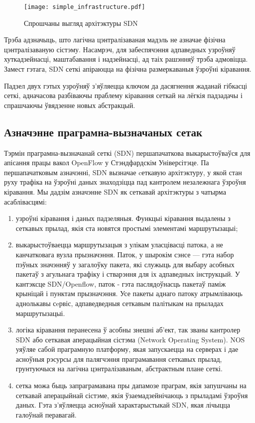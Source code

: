 \clearpage

\begin{figure}[ht!]
    \centering
    \texttt{[image: simple\_infrastructure.pdf]}
    \vspace{-\baselineskip}
    \caption{Спрошчаны выгляд архітэктуры SDN}
    \label{img: Simple Infrastructure}
\end{figure}

Трэба адзначыць, што лагічна цэнтралізаваная мадэль не азначае фізічна цэнтралізаваную сістэму.
Насамрэч, для забеспячэння адпаведных узроўняў хуткадзейнасці, маштабавання і надзейнасці,
ад таіх рашэнняў трэба адмовіцца. Замест гэтага, SDN сеткі апіраюцца на фізічна размеркаваныя
ўзроўні кіравання.

Падзел двух гэтых узроўняў з'яўляецца ключом да дасягнення жаданай гібкасці сеткі,
адначасова разбіваючы праблему кіравання сеткай на лёгкія падзадачы і спрашчаючы ўвядзенне новых абстракцый.

\subsection{Азначэнне праграмна-вызначаных сетак}

Тэрмін праграмна-вызначанай сеткі (SDN) першапачаткова выкарыстоўваўся для апісання
працы вакол OpenFlow у Стэндфардскім Універсітэце.
Па першапачатковым азначэнні, SDN вызначае
cеткавую архітэктуру, у якой стан руху трафіка на ўзроўні даных
знаходзіцца пад кантролем  незалежнага ўзроўня кіравання.
Мы дадзім азначэнне SDN як сеткавай архітэктуры з
чатырма асаблівасцямі:
\begin{enumerate}
    \item узроўні кіравання і даных падзеляныя. Функцыі кіравання выдалены з сеткавых прылад, якія ста
новятся простымі элементамі маршрутызацыі;
    \item выкарыстоўваецца маршрутызацыя з улікам уласцівасці патока, а не канчатковага вузла прызначэння. Паток, у шырокім сэнсе --- гэта набор пэўных значэнняў у загалоўку пакета,
які служыць для выбару асобных пакетаў з агульнага трафіку і стварэння для іх адпаведных інструкцый.
У кантэксце SDN/Openflow, паток - гэта паслядоўнасць пакетаў паміж крыніцай і пунктам прызначэння.
Усе пакеты аднаго патоку атрымліваюць аднолькавы сeрвіс, адпаведведныя сеткавым палітыкам на прыладах маршрутызацыі.
    \item логіка кіравання перанесена ў асобны знешні аб'ект, так званы кантролер SDN або сеткавая аперацыйная сістэма (Network Operating System). NOS уяўляе сабой праграмную платформу, якая запускаецца на серверах і дае асноўныя рэсурсы для палягчэння праграмавання сеткавых прылад, грунтуючыся на лагічна
цэнтралізаваным, абстрактным плане сеткі.
    \item сетка можа быць запраграмавана пры дапамозе праграм, якія запушчаны на
    сеткавай аперацыйнай сістэме, якія ўзаемадзейнічаюць з прыладамі ўзроўня даных.
    Гэта з'яўляецца асноўнай характарыстыкай SDN, якая лічыцца галоўнай перавагай.
\end{enumerate}

